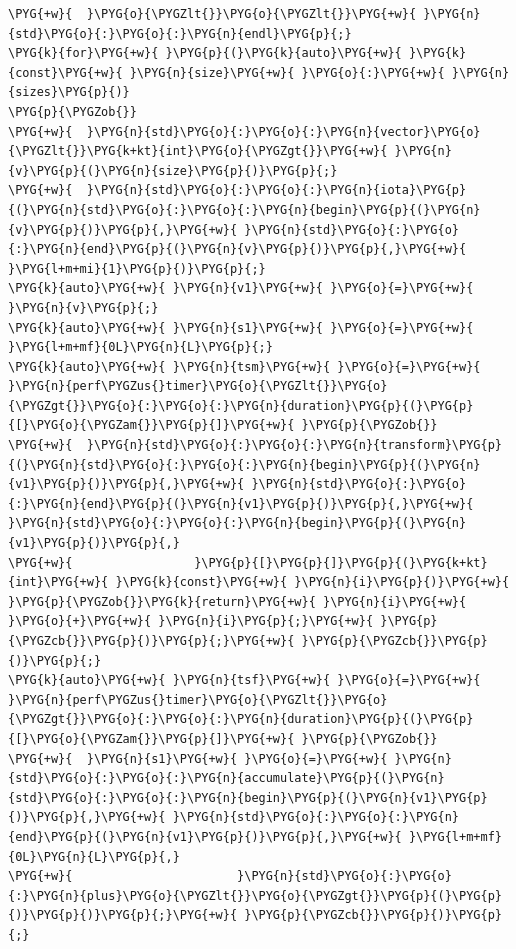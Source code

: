 \begin{codeblockbg}
\begin{Verbatim}[commandchars=\\\{\},breaklines=true,breakanywhere=true,fontsize=\codefont,xleftmargin=17bp]
\PYG{+w}{  }\PYG{o}{\PYGZlt{}}\PYG{o}{\PYGZlt{}}\PYG{+w}{ }\PYG{n}{std}\PYG{o}{:}\PYG{o}{:}\PYG{n}{endl}\PYG{p}{;}
\PYG{k}{for}\PYG{+w}{ }\PYG{p}{(}\PYG{k}{auto}\PYG{+w}{ }\PYG{k}{const}\PYG{+w}{ }\PYG{n}{size}\PYG{+w}{ }\PYG{o}{:}\PYG{+w}{ }\PYG{n}{sizes}\PYG{p}{)}
\PYG{p}{\PYGZob{}}
\PYG{+w}{  }\PYG{n}{std}\PYG{o}{:}\PYG{o}{:}\PYG{n}{vector}\PYG{o}{\PYGZlt{}}\PYG{k+kt}{int}\PYG{o}{\PYGZgt{}}\PYG{+w}{ }\PYG{n}{v}\PYG{p}{(}\PYG{n}{size}\PYG{p}{)}\PYG{p}{;}
\PYG{+w}{  }\PYG{n}{std}\PYG{o}{:}\PYG{o}{:}\PYG{n}{iota}\PYG{p}{(}\PYG{n}{std}\PYG{o}{:}\PYG{o}{:}\PYG{n}{begin}\PYG{p}{(}\PYG{n}{v}\PYG{p}{)}\PYG{p}{,}\PYG{+w}{ }\PYG{n}{std}\PYG{o}{:}\PYG{o}{:}\PYG{n}{end}\PYG{p}{(}\PYG{n}{v}\PYG{p}{)}\PYG{p}{,}\PYG{+w}{ }\PYG{l+m+mi}{1}\PYG{p}{)}\PYG{p}{;}
\PYG{k}{auto}\PYG{+w}{ }\PYG{n}{v1}\PYG{+w}{ }\PYG{o}{=}\PYG{+w}{ }\PYG{n}{v}\PYG{p}{;}
\PYG{k}{auto}\PYG{+w}{ }\PYG{n}{s1}\PYG{+w}{ }\PYG{o}{=}\PYG{+w}{ }\PYG{l+m+mf}{0L}\PYG{n}{L}\PYG{p}{;}
\PYG{k}{auto}\PYG{+w}{ }\PYG{n}{tsm}\PYG{+w}{ }\PYG{o}{=}\PYG{+w}{ }\PYG{n}{perf\PYGZus{}timer}\PYG{o}{\PYGZlt{}}\PYG{o}{\PYGZgt{}}\PYG{o}{:}\PYG{o}{:}\PYG{n}{duration}\PYG{p}{(}\PYG{p}{[}\PYG{o}{\PYGZam{}}\PYG{p}{]}\PYG{+w}{ }\PYG{p}{\PYGZob{}}
\PYG{+w}{  }\PYG{n}{std}\PYG{o}{:}\PYG{o}{:}\PYG{n}{transform}\PYG{p}{(}\PYG{n}{std}\PYG{o}{:}\PYG{o}{:}\PYG{n}{begin}\PYG{p}{(}\PYG{n}{v1}\PYG{p}{)}\PYG{p}{,}\PYG{+w}{ }\PYG{n}{std}\PYG{o}{:}\PYG{o}{:}\PYG{n}{end}\PYG{p}{(}\PYG{n}{v1}\PYG{p}{)}\PYG{p}{,}\PYG{+w}{ }\PYG{n}{std}\PYG{o}{:}\PYG{o}{:}\PYG{n}{begin}\PYG{p}{(}\PYG{n}{v1}\PYG{p}{)}\PYG{p}{,}
\PYG{+w}{                 }\PYG{p}{[}\PYG{p}{]}\PYG{p}{(}\PYG{k+kt}{int}\PYG{+w}{ }\PYG{k}{const}\PYG{+w}{ }\PYG{n}{i}\PYG{p}{)}\PYG{+w}{ }\PYG{p}{\PYGZob{}}\PYG{k}{return}\PYG{+w}{ }\PYG{n}{i}\PYG{+w}{ }\PYG{o}{+}\PYG{+w}{ }\PYG{n}{i}\PYG{p}{;}\PYG{+w}{ }\PYG{p}{\PYGZcb{}}\PYG{p}{)}\PYG{p}{;}\PYG{+w}{ }\PYG{p}{\PYGZcb{}}\PYG{p}{)}\PYG{p}{;}
\PYG{k}{auto}\PYG{+w}{ }\PYG{n}{tsf}\PYG{+w}{ }\PYG{o}{=}\PYG{+w}{ }\PYG{n}{perf\PYGZus{}timer}\PYG{o}{\PYGZlt{}}\PYG{o}{\PYGZgt{}}\PYG{o}{:}\PYG{o}{:}\PYG{n}{duration}\PYG{p}{(}\PYG{p}{[}\PYG{o}{\PYGZam{}}\PYG{p}{]}\PYG{+w}{ }\PYG{p}{\PYGZob{}}
\PYG{+w}{  }\PYG{n}{s1}\PYG{+w}{ }\PYG{o}{=}\PYG{+w}{ }\PYG{n}{std}\PYG{o}{:}\PYG{o}{:}\PYG{n}{accumulate}\PYG{p}{(}\PYG{n}{std}\PYG{o}{:}\PYG{o}{:}\PYG{n}{begin}\PYG{p}{(}\PYG{n}{v1}\PYG{p}{)}\PYG{p}{,}\PYG{+w}{ }\PYG{n}{std}\PYG{o}{:}\PYG{o}{:}\PYG{n}{end}\PYG{p}{(}\PYG{n}{v1}\PYG{p}{)}\PYG{p}{,}\PYG{+w}{ }\PYG{l+m+mf}{0L}\PYG{n}{L}\PYG{p}{,}
\PYG{+w}{                       }\PYG{n}{std}\PYG{o}{:}\PYG{o}{:}\PYG{n}{plus}\PYG{o}{\PYGZlt{}}\PYG{o}{\PYGZgt{}}\PYG{p}{(}\PYG{p}{)}\PYG{p}{)}\PYG{p}{;}\PYG{+w}{ }\PYG{p}{\PYGZcb{}}\PYG{p}{)}\PYG{p}{;}

\end{Verbatim}
\end{codeblockbg}
